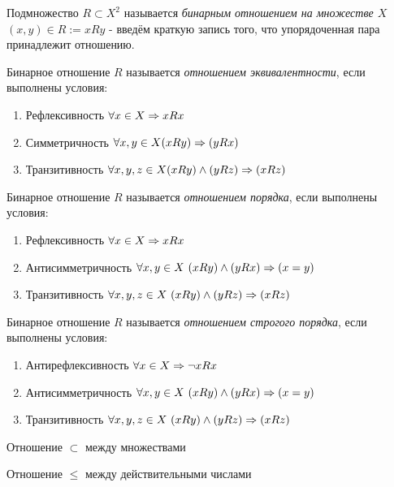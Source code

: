 \begin{definition}
    Подмножество $R \subset X^2$ называется \textit{бинарным отношением на множестве $X$} \\
    $(x, y) \in R := xRy$ - введём краткую запись того, что упорядоченная пара принадлежит отношению.
\end{definition}

\begin{definition}
    Бинарное отношение $R$ называется \textit{отношением эквивалентности}, если выполнены условия:
    \begin{enumerate}
        \item Рефлексивность $\forall x \in X \Rightarrow xRx$
        \item Симметричность $\forall x, y \in X (xRy) \Rightarrow (yRx)$
        \item Транзитивность $\forall x, y, z \in X (xRy) \wedge (yRz) \Rightarrow (xRz)$
    \end{enumerate}
\end{definition}

\begin{definition}
    Бинарное отношение $R$ называется \textit{отношением порядка}, если выполнены условия:
    \begin{enumerate}
        \item Рефлексивность $\forall x \in X \Rightarrow xRx$
        \item Антисимметричность $\forall x, y \in X\ (xRy) \wedge (yRx) \Ra (x = y)$
        \item Транзитивность
        $\forall x, y, z \in X\ (xRy) \wedge (yRz) \Ra (xRz)$
    \end{enumerate}
\end{definition}

\begin{adefinition}
    Бинарное отношение $R$ называется \textit{отношением строгого порядка}, если выполнены условия:
    \begin{enumerate}
        \item Антирефлексивность $\forall x \in X \Rightarrow \neg xRx$
        \item Антисимметричность $\forall x, y \in X\ (xRy) \wedge (yRx) \Ra (x = y)$
        \item Транзитивность
        $\forall x, y, z \in X\ (xRy) \wedge (yRz) \Ra (xRz)$
    \end{enumerate}
\end{adefinition}

\begin{example}
    Отношение $\subset$ между множествами
\end{example}
\begin{example}
    Отношение $\le$ между действительными числами
\end{example}

